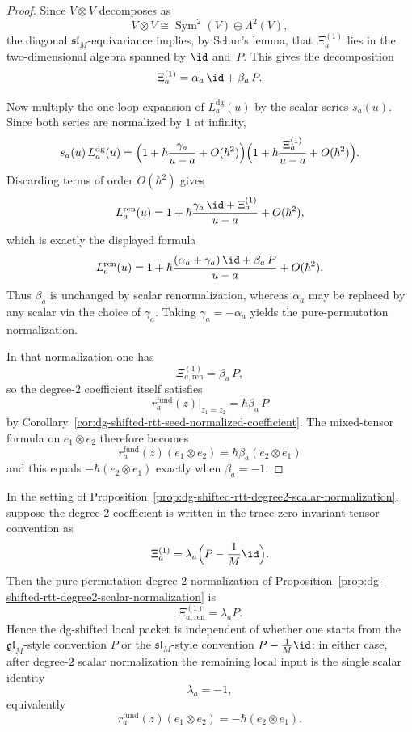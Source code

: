 \begin{proof}
Since $V\otimes V$ decomposes as
\[
V\otimes V
\cong
\operatorname{Sym}^2(V)\oplus \Lambda^2(V),
\]
the diagonal $\mathfrak{sl}_M$-equivariance implies, by Schur's lemma,
that $\Xi_a^{(1)}$ lies in the two-dimensional algebra spanned by
$\id$ and~$P$.  This gives the decomposition
\[
\Xi_a^{(1)}=\alpha_a\,\id+\beta_a\,P.
\]

Now multiply the one-loop expansion of $L_a^{\mathrm{dg}}(u)$ by the
scalar series $s_a(u)$.  Since both series are normalized by $1$ at
infinity,
\[
s_a(u)\,L_a^{\mathrm{dg}}(u)
=
\Bigl(1+\hbar\frac{\gamma_a}{u-a}+O(\hbar^2)\Bigr)
\Bigl(1+\hbar\frac{\Xi_a^{(1)}}{u-a}+O(\hbar^2)\Bigr).
\]
Discarding terms of order $O(\hbar^2)$ gives
\[
L_a^{\mathrm{ren}}(u)
=
1+\hbar\frac{\gamma_a\,\id+\Xi_a^{(1)}}{u-a}+O(\hbar^2),
\]
which is exactly the displayed formula
\[
L_a^{\mathrm{ren}}(u)
=
1+\hbar\frac{(\alpha_a+\gamma_a)\,\id+\beta_a\,P}{u-a}+O(\hbar^2).
\]
Thus $\beta_a$ is unchanged by scalar renormalization, whereas
$\alpha_a$ may be replaced by any scalar via the choice of $\gamma_a$.
Taking $\gamma_a=-\alpha_a$ yields the pure-permutation normalization.

In that normalization one has
\[
\Xi_{a,\mathrm{ren}}^{(1)}=\beta_a\,P,
\]
so the degree-$2$ coefficient itself satisfies
\[
r_a^{\mathrm{fund}}(z)\big|_{z_1=z_2}
=
\hbar\beta_a\,P
\]
by
Corollary~\ref{cor:dg-shifted-rtt-seed-normalized-coefficient}.  The
mixed-tensor formula on $e_1\otimes e_2$ therefore becomes
\[
r_a^{\mathrm{fund}}(z)(e_1\otimes e_2)
=
\hbar\beta_a(e_2\otimes e_1)
\]
and this
equals $-\hbar(e_2\otimes e_1)$ exactly when $\beta_a=-1$.
\end{proof}

\begin{corollary}
\label{cor:dg-shifted-rtt-degree2-casimir-normalization}
In the setting of
Proposition~\ref{prop:dg-shifted-rtt-degree2-scalar-normalization},
suppose the degree-$2$ coefficient is written in the trace-zero
invariant-tensor convention as
\[
\Xi_a^{(1)}
=
\lambda_a\Bigl(P-\frac{1}{M}\id\Bigr).
\]
Then the pure-permutation degree-$2$ normalization of
Proposition~\ref{prop:dg-shifted-rtt-degree2-scalar-normalization} is
\[
\Xi_{a,\mathrm{ren}}^{(1)}=\lambda_a P.
\]
Hence the dg-shifted local packet is independent of whether one starts
from the $\mathfrak{gl}_M$-style convention $P$ or the
$\mathfrak{sl}_M$-style convention $P-\frac{1}{M}\id$: in either case,
after degree-$2$ scalar normalization the remaining local input is the
single scalar identity
\[
\lambda_a=-1,
\]
equivalently
\[
r_a^{\mathrm{fund}}(z)(e_1\otimes e_2)
=
-\hbar(e_2\otimes e_1).
\]
\end{corollary}


